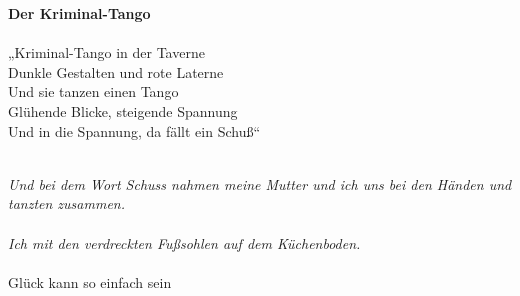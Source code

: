 \begin{center}
	\textbf{Der Kriminal-Tango}\\\\
„Kriminal-Tango in der Taverne\\
Dunkle Gestalten und rote Laterne\\ 
Und sie tanzen einen Tango \\
Glühende Blicke, steigende Spannung \\
Und in die Spannung, da fällt ein Schuß“\\\\
\end{center}

\textit{Und bei dem Wort Schuss nahmen meine Mutter und ich uns bei den Händen und tanzten zusammen.\\\\
Ich mit den verdreckten Fußsohlen auf dem Küchenboden.\\\\
}
Glück kann so einfach sein